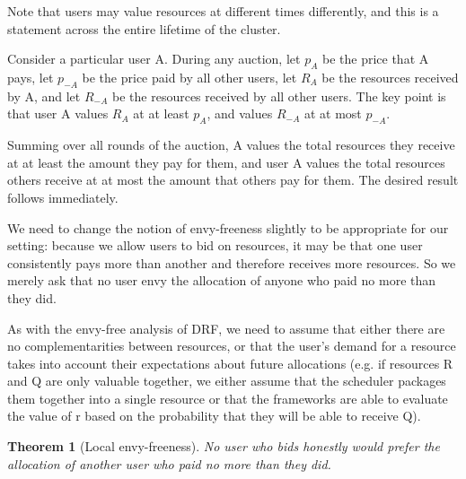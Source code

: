 \documentclass{acm_proc_article-sp}
\newtheorem{theorem}{Theorem}[section]
\newenvironment{pproof}[1][Proof]{\begin{trivlist}
\item[\hskip \labelsep {\bfseries #1}]}{\end{trivlist}}
\begin{document}
Note that users may value resources at different times differently, and this is a statement across the entire lifetime of the cluster.
\begin{pproof}
Consider a particular user A. 
During any auction, let $p_A$ be the price that A pays, let $p_{-A}$ be the price paid by all other users, let $R_A$ be the resources received by A, 
and let $R_{-A}$ be the resources received by all other users. The key point is that user A values $R_A$ at at least $p_A$, and values $R_{-A}$ at at most $p_{-A}$. 

Summing over all rounds of the auction, A values the total resources they receive at at least the amount they pay for them, 
and user A values the total resources others receive at at most the amount that others pay for them. The desired result follows immediately.
\end{pproof}

We need to change the notion of envy-freeness slightly to be appropriate for our setting: 
because we allow users to bid on resources, it may be that one user consistently pays more than another and therefore receives more resources. 
So we merely ask that no user envy the allocation of anyone who paid no more than they did.

As with the envy-free analysis of DRF, we need to assume that either there are no complementarities between resources, or that the user's demand for a resource takes into account their expectations about future allocations (e.g. if resources R and Q are only valuable together, we either assume that the scheduler packages them together into a single resource or that the frameworks are able to evaluate the value of r based on the probability that they will be able to receive Q).

\begin{theorem}[Local envy-freeness]
No user who bids honestly would prefer the allocation of another user who paid no more than they did.
\end{theorem}
\end{document}
